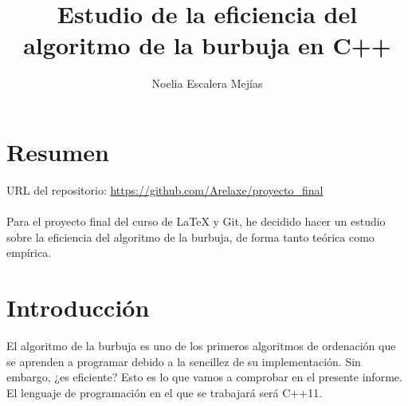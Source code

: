 \documentclass[a4paper,11pt]{article}
\begin{document}
\title{Estudio de la eficiencia del algoritmo de la burbuja en C++}
\author{Noelia Escalera Mejías}
\date{}
\maketitle
\section{Resumen}
URL del repositorio:
\url{https://github.com/Arelaxe/proyecto_final}
\\ \\
Para el proyecto final del curso de LaTeX y Git, he decidido hacer un estudio sobre la eficiencia del algoritmo de la burbuja, de forma tanto teórica como empírica.
\section{Introducción}
El algoritmo de la burbuja es uno de los primeros algoritmos de ordenación que se aprenden a programar debido a la sencillez de su implementación. Sin embargo, ¿es eficiente? Esto es lo que vamos a comprobar en el presente informe. El lenguaje de programación en el que se trabajará será C++11.
\end{document}
